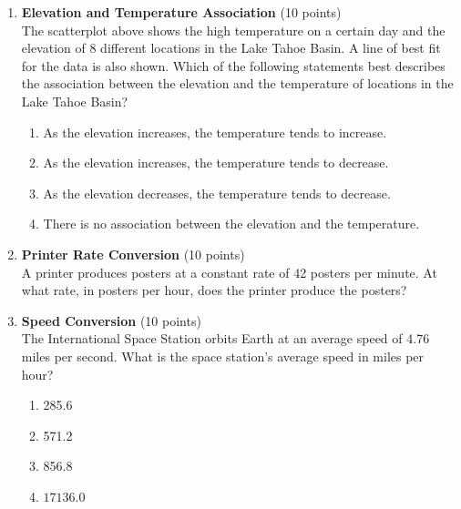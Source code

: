 \begin{enumerate}
  \item \textbf{Elevation and Temperature Association} (10 points)\\
  The scatterplot above shows the high temperature on a certain day and the elevation of 8 different locations in the Lake Tahoe Basin. A line of best fit for the data is also shown. Which of the following statements best describes the association between the elevation and the temperature of locations in the Lake Tahoe Basin?
  \begin{enumerate}[label=(\Alph*)]
    \item As the elevation increases, the temperature tends to increase.
    \item As the elevation increases, the temperature tends to decrease.
    \item As the elevation decreases, the temperature tends to decrease.
    \item There is no association between the elevation and the temperature.
  \end{enumerate}
  \begin{subanswer}
  \end{subanswer}
  \item \textbf{Printer Rate Conversion} (10 points)\\
  A printer produces posters at a constant rate of 42 posters per minute. At what rate, in posters per hour, does the printer produce the posters?
  \begin{subanswer}
  \end{subanswer}

  \newpage

  \item \textbf{Speed Conversion} (10 points)\\
  The International Space Station orbits Earth at an average speed of 4.76 miles per second. What is the space station's average speed in miles per hour?
  \begin{enumerate}[label=(\Alph*)]
    \item 285.6
    \item 571.2
    \item 856.8
    \item $17136.0$
  \end{enumerate}
  \begin{subanswer}
  \end{subanswer}


\end{enumerate}
